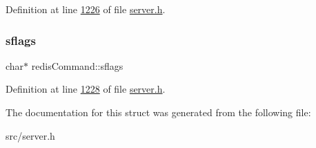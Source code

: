 Definition at line \hyperlink{server_8h_source_l01226}{1226} of file \hyperlink{server_8h_source}{server.\+h}.

\mbox{\label{structredisCommand_aa42bde2bbb812fa8fa4e2645fd154215}} 
\subsubsection{\texorpdfstring{sflags}{sflags}}
{\footnotesize\ttfamily char$\ast$ redis\+Command\+::sflags}



Definition at line \hyperlink{server_8h_source_l01228}{1228} of file \hyperlink{server_8h_source}{server.\+h}.



The documentation for this struct was generated from the following file\+:\begin{DoxyCompactItemize}
\item 
src/server.\+h\end{DoxyCompactItemize}
